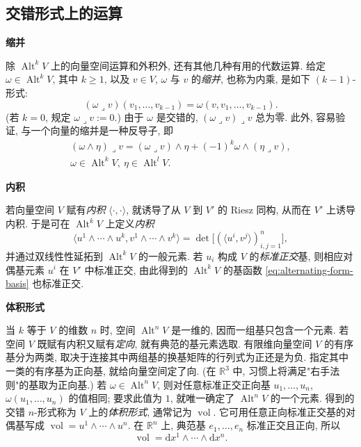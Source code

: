 \subsection{交错形式上的运算}\label{subsec:alternating-form-operations}

\medskip\noindent\textbf{{缩并}}\par
除 $\operatorname{Alt}^kV$ 上的向量空间运算和外积外, 还有其他几种有用的代数运算. 给定 $\omega\in\operatorname{Alt}^kV$, 其中 $k\geq1$, 以及 $v\in V$, $\omega$ 与 $v$ 的\emph{缩并}, 也称为内乘, 是如下 $(k-1)$-形式:
\[
(\omega\lrcorner v)(v_1,\ldots,v_{k-1})=\omega(v,v_1,\ldots,v_{k-1}).
\]
(若 $k=0$, 规定 $\omega\lrcorner v:=0$.) 由于 $\omega$ 是交错的, $(\omega\lrcorner v)\lrcorner v$ 总为零. 此外, 容易验证, 与一个向量的缩并是一种反导子, 即
\[
\begin{gathered}
(\omega\wedge\eta)\lrcorner v=(\omega\lrcorner v)\wedge\eta+(-1)^k\omega\wedge(\eta\lrcorner v),\\
\omega\in\operatorname{Alt}^kV,\ \eta\in\operatorname{Alt}^lV.
\end{gathered}
\]

\medskip\noindent\textbf{{内积}}\par
若向量空间 $V$ 赋有\emph{内积} $\langle\cdot,\cdot\rangle$, 就诱导了从 $V$ 到 $V'$ 的 Riesz 同构, 从而在 $V'$ 上诱导内积. 于是可在 $\operatorname{Alt}^kV$ 上定义\emph{内积}
\[
\langle u^1\wedge\cdots\wedge u^k,v^1\wedge\cdots\wedge v^k\rangle=\det\big[(\langle u^i,v^j\rangle)_{i,j=1}^n\big],
\]
并通过双线性性延拓到 $\operatorname{Alt}^kV$ 的一般元素. 若 $u_i$ 构成 $V$ 的\emph{标准正交}基, 则相应对偶基元素 $u^i$ 在 $V'$ 中标准正交, 由此得到的 $\operatorname{Alt}^kV$ 的基函数 \eqref{eq:alternating-form-basis} 也标准正交.

\medskip\noindent\textbf{{体积形式}}\par
当 $k$ 等于 $V$ 的维数 $n$ 时, 空间 $\operatorname{Alt}^nV$ 是一维的, 因而一组基只包含一个元素. 若空间 $V$ 既赋有内积又赋有\emph{定向}, 就有典范的基元素选取. 有限维向量空间 $V$ 的有序基分为两类, 取决于连接其中两组基的换基矩阵的行列式为正还是为负. 指定其中一类的有序基为正向基, 就给向量空间定了向. (在 $\mathbb R^3$ 中, 习惯上将满足"右手法则"的基取为正向基.) 若 $\omega\in\operatorname{Alt}^nV$, 则对任意标准正交正向基 $u_1,\ldots,u_n$, $\omega(u_1,\ldots,u_n)$ 的值相同; 要求此值为 $1$, 就唯一确定了 $\operatorname{Alt}^nV$ 的一个元素. 得到的交错 $n$-形式称为 $V$ 上的\emph{体积形式}, 通常记为 $\operatorname{vol}$. 它可用任意正向标准正交基的对偶基写成 $\operatorname{vol}=u^1\wedge\cdots\wedge u^n$. 在 $\mathbb R^n$ 上, 典范基 $e_1,\ldots,e_n$ 标准正交且正向, 所以
\[
\operatorname{vol}=\mathrm{d}x^1\wedge\cdots\wedge \mathrm{d}x^n.
\]

